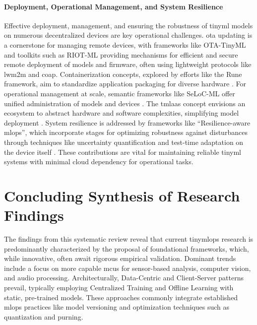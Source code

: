 \paragraph{Deployment, Operational Management, and System Resilience}
Effective deployment, management, and ensuring the robustness of \gls{tinyml} models on numerous decentralized devices are key operational challenges. \gls{ota} updating is a cornerstone for managing remote devices, with frameworks like OTA-TinyML \cite{sudharsanOTATinyMLAirDeployment2022} and toolkits such as RIOT-ML \cite{huangRIOTMLToolkitOvertheair2024a} providing mechanisms for efficient and secure remote deployment of models and firmware, often using lightweight protocols like \gls{lwm2m} and \gls{coap}. Containerization concepts, explored by efforts like the Rune framework, aim to standardize application packaging for diverse hardware \cite{lootusVMContainerizedApproach2022}. For operational management at scale, semantic frameworks like SeLoC-ML offer unified administration of models and devices \cite{renOndeviceOnlineLearning2024}. The \gls{tmlaas} concept envisions an ecosystem to abstract hardware and software complexities, simplifying model deployment \cite{doyuTinyMLaaSEcosystemMachine2021}. System resilience is addressed by frameworks like ``Resilience-aware \gls{mlops}'', which incorporate stages for optimizing robustness against disturbances  through techniques like uncertainty quantification and test-time adaptation on the device itself \cite{moskalenkoResilienceawareMLOpsResourceconstrained2023}. These contributions are vital for maintaining reliable \gls{tinyml} systems with minimal cloud dependency for operational tasks.

\section{Concluding Synthesis of Research Findings}
\label{sec:Concluding_Synthesis_Research_Results}

The findings from this systematic review reveal that current \gls{tinymlops} research is predominantly characterized by the proposal of foundational frameworks, which, while innovative, often await rigorous empirical validation. Dominant trends include a focus on more capable \glspl{mcu} for sensor-based analysis, computer vision, and audio processing. Architecturally, Data-Centric and Client-Server patterns prevail, typically employing Centralized Training and Offline Learning with static, pre-trained models. These approaches commonly integrate established \gls{mlops} practices like model versioning and optimization techniques such as quantization and purning.

